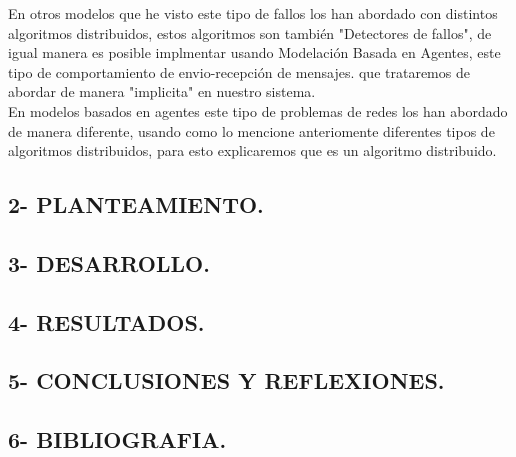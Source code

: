 \documentclass[12pt]{article}
\begin{document}
En otros modelos que he visto este tipo de fallos los han abordado con distintos algoritmos distribuidos, estos algoritmos son también "Detectores de fallos", de igual manera es posible implmentar usando Modelación Basada en Agentes, este tipo de comportamiento de envio-recepción de mensajes. que trataremos de abordar de manera "implicita" en nuestro sistema.\\

En modelos basados en agentes este tipo de problemas de redes los han abordado de manera diferente, usando como lo mencione anteriomente diferentes tipos de algoritmos distribuidos, para esto explicaremos que es un algoritmo distribuido.













{\color{blue} \subsection*{2- PLANTEAMIENTO.}}
\vspace{1em}


{\color{blue} \subsection*{3- DESARROLLO.}}
\vspace{1em}

{\color{blue} \subsection*{4- RESULTADOS.}}
\vspace{1em}

{\color{blue} \subsection*{5- CONCLUSIONES Y REFLEXIONES.}}
\vspace{1em}

{\color{blue} \subsection*{6- BIBLIOGRAFIA.}}
\vspace{1em}
\end{document}
